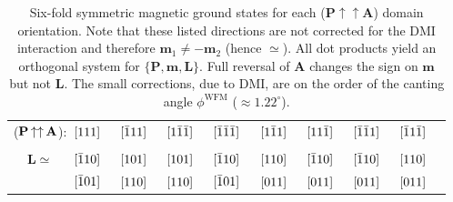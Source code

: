 \documentclass[%
 reprint,
superscriptaddress,
 amsmath,amssymb,
prb,
]{revtex4-1}
\begin{document}
\begin{table}[h!]%
\caption{\label{tab:magGs}%
Six-fold symmetric magnetic ground states for each ($\mathbf{P}\uparrow\uparrow\mathbf{A}$) domain orientation. Note that these listed directions are not corrected for the DMI interaction and therefore $\mathbf{m}_1 \neq - \mathbf{m}_2$ (hence $\simeq$). All dot products yield an orthogonal system for $\{ \textbf{P}, \textbf{m}, \textbf{L}  \}$. Full reversal of $\mathbf{A}$ changes the sign on $\mathbf{m}$ but not $\mathbf{L}$. The small corrections, due to DMI, are on the order of the canting angle $\phi^\mathrm{WFM}$ ($\approx 1.22^\circ$).
}
\begin{ruledtabular}
\begin{tabular}{c c c c c c c c c c c c c c c c c}
 ($\mathbf{P}\hspace{-1pt}\uparrow\uparrow\hspace{-1pt}\mathbf{A}$): & $\hspace{-5pt}[111]$ & & $\hspace{-5pt}[\bar{1}11]$& & $\hspace{-5pt}[1\bar{1}\bar{1}]$& & $\hspace{-5pt}[\bar{1}\bar{1}\bar{1}]$ &  & $\hspace{-5pt}[1\bar{1}1]$ & & $\hspace{-5pt}[11\bar{1}]$&  & $\hspace{-5pt}[\bar{1}\bar{1}1]$& & $\hspace{-5pt}[\bar{1}1\bar{1}]$& \\ 
\colrule
& & & & & & & & & & & & & & & & \\
$\mathbf{L} \simeq$ & $\hspace{-5pt}[\bar{1}10]$  & & $\hspace{-5pt}[101]$ & & $\hspace{-5pt}[101]$ & & $\hspace{-5pt}[\bar{1}10]$ & & $\hspace{-5pt}[110]$ & & $\hspace{-5pt}[\bar{1}10]$ & & $\hspace{-5pt}[\bar{1}10]$ & & $\hspace{-5pt}[110]$ &\\ %
& $\hspace{-5pt}[\bar{1}01]$ & & $\hspace{-5pt}[110]$ & & $\hspace{-5pt}[110]$ & & $\hspace{-5pt}[\bar{1}01]$ & & $\hspace{-5pt}[011]$ & & $\hspace{-5pt}[011]$ & & $\hspace{-5pt}[011]$ & & $\hspace{-5pt}[011]$ &\\ %

\end{tabular}
\end{ruledtabular}
\end{table}
\end{document}

